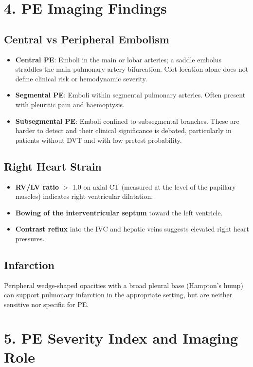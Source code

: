 \section{4. PE Imaging Findings}

\subsection{Central vs Peripheral Embolism}
\begin{itemize}
  \item \textbf{Central PE}: Emboli in the main or lobar arteries; a saddle embolus straddles the main pulmonary artery bifurcation. Clot location alone does not define clinical risk or hemodynamic severity.
  \item \textbf{Segmental PE}: Emboli within segmental pulmonary arteries. Often present with pleuritic pain and haemoptysis.
  \item \textbf{Subsegmental PE}: Emboli confined to subsegmental branches. These are harder to detect and their clinical significance is debated, particularly in patients without DVT and with low pretest probability.
\end{itemize}

\subsection{Right Heart Strain}
\begin{itemize}
  \item \textbf{RV/LV ratio} $>$ 1.0 on axial CT (measured at the level of the papillary muscles) indicates right ventricular dilatation.
  \item \textbf{Bowing of the interventricular septum} toward the left ventricle.
  \item \textbf{Contrast reflux} into the IVC and hepatic veins suggests elevated right heart pressures.
\end{itemize}

\subsection{Infarction}
Peripheral wedge-shaped opacities with a broad pleural base (Hampton's hump) can support pulmonary infarction in the appropriate setting, but are neither sensitive nor specific for PE.

\section{5. PE Severity Index and Imaging Role}

